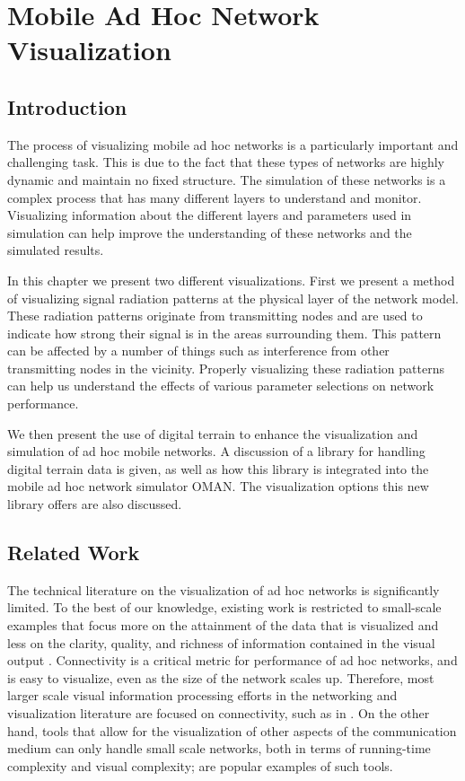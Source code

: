 \chapter{Mobile Ad Hoc Network Visualization}
\label{chap:network_vis}

\section{Introduction}
The process of visualizing mobile ad hoc networks is a particularly important and challenging task. This is due to the fact that these types of networks are highly dynamic and maintain no fixed structure.  The simulation of these networks is a complex process that has many different layers to understand and monitor.  Visualizing information about the different layers and parameters used in simulation can help improve the understanding of these networks and the simulated results.

In this chapter we present two different visualizations.  First we present a method of visualizing signal radiation patterns at the physical layer of the network model.  These radiation patterns originate from transmitting nodes and are used to indicate how strong their signal is in the areas surrounding them.  This pattern can be affected by a number of things such as interference from other transmitting nodes in the vicinity.  Properly visualizing these radiation patterns can help us understand the effects of various parameter selections on network performance.

We then present the use of digital terrain to enhance the visualization and simulation of ad hoc mobile networks.  A discussion of a library for handling digital terrain data is given, as well as how this library is integrated into the mobile ad hoc network simulator OMAN.  The visualization options this new library offers are also discussed.

\section{Related Work}
The technical literature on the visualization of ad hoc networks is significantly limited. To the best of our knowledge, existing work is restricted to small-scale examples that focus more on the attainment of the data that is visualized and less on the clarity, quality, and richness of information contained in the visual output \cite{DhoVoGue03}. Connectivity is a critical metric for performance of ad hoc networks, and is easy to visualize, even as the size of the network scales up. Therefore, most larger scale visual information processing efforts in the networking and visualization literature are focused on connectivity, such as in \cite{Bettsetetter04, HamWij04, BecEicWil95, HerMelMar00}. On the other hand, tools that allow for the visualization of other aspects of the communication medium can only handle small scale networks, both in terms of running-time complexity and visual complexity; \cite{FitSeeRei04, MatBieLau05, EstHanHei00} are popular examples of such tools.

